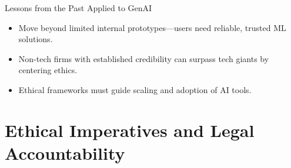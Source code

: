 \documentclass[aspectratio=169]{beamer}
\begin{document}
\begin{frame}{Lessons from the Past Applied to GenAI}
\begin{itemize}
\item Move beyond limited internal prototypes—users need reliable, trusted ML solutions.
\item Non-tech firms with established credibility can surpass tech giants by centering ethics.
\item Ethical frameworks must guide scaling and adoption of AI tools.
\end{itemize}
\end{frame}

\section{Ethical Imperatives and Legal Accountability}
\end{document}
